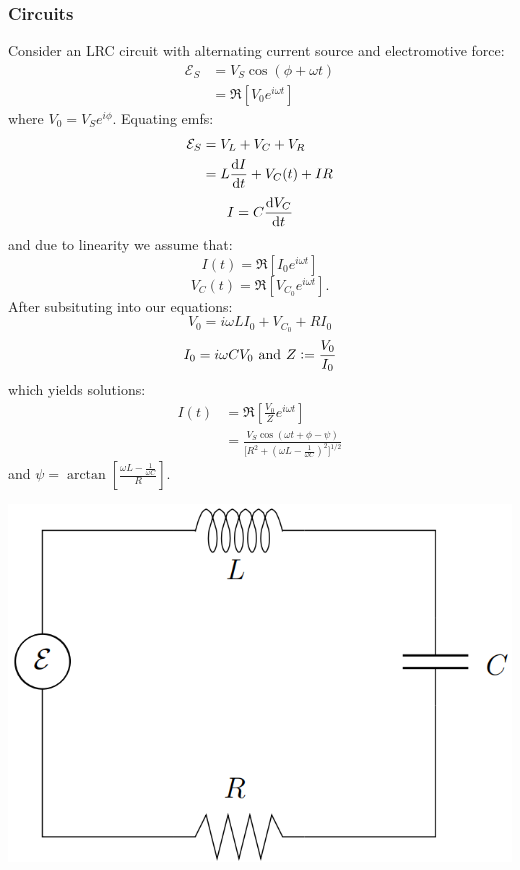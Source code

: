 \documentclass{article}
\newcommand{\deq}{\vcentcolon=}
\begin{document}
\begin{multicols*}{3}
\subsubsection*{Circuits}
Consider an LRC circuit with alternating current source
and electromotive force:
\begin{align*}
    \mathcal{E}_S
    &= V_S\cos(\phi+\omega t) \\
    &= \Re[V_0 e^{i\omega t}]
\end{align*}
where $V_0=V_S e^{i\phi}$. Equating emfs:
\begin{align*}
    \mathcal{E}_S
    &=V_L+V_C+V_R \\
    &=L\dv{I}{t}+V_C(t)+IR
\end{align*}
$$I=C\dv{V_C}{t}$$
and due to linearity we assume that:
$$I(t)=\Re[I_0 e^{i\omega t}]$$
$$V_C(t)=\Re[V_{C_0} e^{i\omega t}].$$
After subsituting into our equations:
$$V_0=i\omega L I_0+V_{C_0}+RI_0$$
$$I_0=i\omega C V_0
\hspace{0.05in}\text{and}\hspace{0.05in}
Z\deq\frac{V_0}{I_0}$$
which yields solutions:
\begin{align*}
    I(t)
    &=\Re\left[\frac{V_0}{Z}e^{i\omega t}\right] \\
    &=\frac{V_S\cos(\omega t+\phi-\psi)}
    {\bigl[R^2+(\omega L-\frac{1}{\omega C})^2\bigr]^{1/2}}
\end{align*}
and $\displaystyle\psi=\arctan\left[
\frac{\omega L-\frac{1}{\omega C}}{R}\right]$.
\begin{center}
    \includegraphics[scale=0.25]{f11.png}
\end{center}


\end{multicols*}
\end{document}
